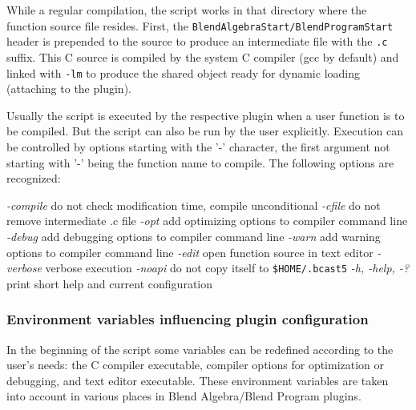 While a regular compilation, the script works in that directory where the function source file resides. First, the \texttt{BlendAlgebraStart/BlendProgramStart} header is prepended to the source to produce an intermediate file with the \texttt{.c} suffix. This C source is compiled by the system C compiler (gcc by default) and linked with \texttt{-lm} to produce the shared object ready for dynamic loading (attaching to the plugin).

Usually the script is executed by the respective \CGG{} plugin when a user function is to be compiled. But the script can also be run by the user explicitly. Execution can be controlled by options starting with the '-' character, the first argument not starting with '-' being the function name to compile. The following options are recognized:

	\textit{  -compile} do not check modification time, compile unconditional \newline
	\textit{  -cfile} do not remove intermediate .c file \newline
	\textit{  -opt} add optimizing options to compiler command line \newline
	\textit{  -debug} add debugging options to compiler command line \newline
	\textit{  -warn} add warning options to compiler command line \newline
	\textit{  -edit} open function source in text editor \newline
	\textit{  -verbose} verbose execution \newline
	\textit{  -noapi} do not copy itself to \texttt{\$HOME/.bcast5} \newline
	\textit{  -h, -help, -?} print short help and current configuration \newline

\subsubsection*{Environment variables influencing plugin configuration}
\label{ssub:environment_variabiles}

In the beginning of the script some variables can be redefined according to the user's needs: the C compiler executable, compiler options for optimization or debugging, and text editor executable.
These environment variables are taken into account in various places in Blend Algebra/Blend Program plugins.

